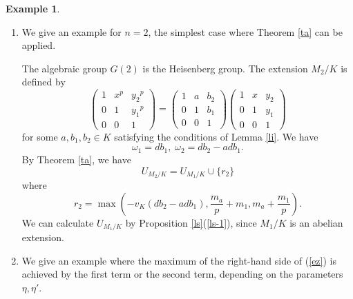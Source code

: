 \documentclass[sn-mathphys-num]{sn-jnl}
\numberwithin{equation}{section}
\theoremstyle{plain}
\theoremstyle{definition}
\newtheorem{exam}[theo]{Example}
\begin{document}
\begin{exam}
  \begin{enumerate}
  \item
    We give an example for $n=2$, the simplest case where Theorem \ref{ta} can be applied.

    The algebraic group $G(2)$ is the Heisenberg group. The extension $M_2/K$ is defined by
  \begin{equation}
  \begin{pmatrix}
    1&x^p&{y_2}^p\\
    0&1&{y_1}^p\\
    0&0&1
  \end{pmatrix}
  =
  \begin{pmatrix}
    1&a&b_2\\
    0&1&b_1\\
    0&0&1
  \end{pmatrix}
  \begin{pmatrix}
    1&x&y_2\\
    0&1&y_1\\
    0&0&1
  \end{pmatrix}
  \end{equation}
  for some $a,b_1,b_2\in K$ satisfying the conditions of Lemma \ref{li}. We have
  \begin{equation}
  \omega_1=db_1,\;\omega_2=db_2-adb_1.
  \end{equation}
  By Theorem \ref{ta}, we have
  \begin{equation}
  U_{M_2/K}=U_{M_1/K}\cup\{r_2\}
  \end{equation}
  where
  \begin{equation}\label{ey}
  r_2=\max\left(-v_K(db_2-adb_1),\frac{m_a}{p}+m_1,m_a+\frac{m_1}{p}\right).
  \end{equation}
  We can calculate $U_{M_1/K}$ by Proposition \ref{ls}(\ref{ls-1}), since $M_1/K$ is an abelian extension.



\item We give an example where the maximum of the right-hand side of (\ref{ez}) is achieved by the first term or the second term, depending on the parameters $\eta,\eta'$.


\end{enumerate}
\end{exam}
\end{document}
